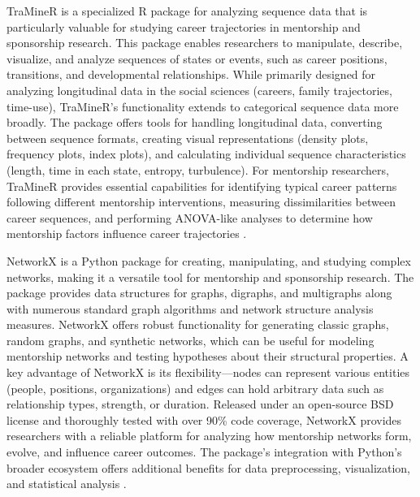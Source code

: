 \documentclass[main.tex]{subfiles}
\begin{document}
TraMineR is a specialized R package for analyzing sequence data that is particularly valuable for studying career trajectories in mentorship and sponsorship research. This package enables researchers to manipulate, describe, visualize, and analyze sequences of states or events, such as career positions, transitions, and developmental relationships. While primarily designed for analyzing longitudinal data in the social sciences (careers, family trajectories, time-use), TraMineR's functionality extends to categorical sequence data more broadly. The package offers tools for handling longitudinal data, converting between sequence formats, creating visual representations (density plots, frequency plots, index plots), and calculating individual sequence characteristics (length, time in each state, entropy, turbulence). For mentorship researchers, TraMineR provides essential capabilities for identifying typical career patterns following different mentorship interventions, measuring dissimilarities between career sequences, and performing ANOVA-like analyses to determine how mentorship factors influence career trajectories \cite{traminer2023sequence}.

NetworkX is a Python package for creating, manipulating, and studying complex networks, making it a versatile tool for mentorship and sponsorship research. The package provides data structures for graphs, digraphs, and multigraphs along with numerous standard graph algorithms and network structure analysis measures. NetworkX offers robust functionality for generating classic graphs, random graphs, and synthetic networks, which can be useful for modeling mentorship networks and testing hypotheses about their structural properties. A key advantage of NetworkX is its flexibility—nodes can represent various entities (people, positions, organizations) and edges can hold arbitrary data such as relationship types, strength, or duration. Released under an open-source BSD license and thoroughly tested with over 90\% code coverage, NetworkX provides researchers with a reliable platform for analyzing how mentorship networks form, evolve, and influence career outcomes. The package's integration with Python's broader ecosystem offers additional benefits for data preprocessing, visualization, and statistical analysis \cite{networkx2023documentation}.
\end{document}
